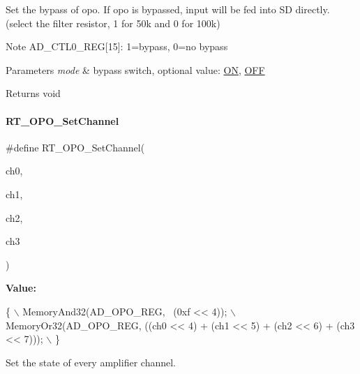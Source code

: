 Set the bypass of opo. If opo is bypassed, input will be fed into SD directly. (select the filter resistor, 1 for 50k and 0 for 100k) 

\begin{DoxyNote}{Note}
A\+D\+\_\+\+C\+T\+L0\+\_\+\+R\+EG\mbox{[}15\mbox{]}\+: 1=bypass, 0=no bypass 
\end{DoxyNote}

\begin{DoxyParams}{Parameters}
{\em mode} & bypass switch, optional value\+: \mbox{\hyperlink{a00020_ab43e533f3793920486fb81c580f71564a977d478dacaae531f95695750d1e9d03}{ON}}, \mbox{\hyperlink{a00020_ab43e533f3793920486fb81c580f71564aac132f2982b98bcaa3445e535a03ff75}{O\+FF}} \\
\hline
\end{DoxyParams}
\begin{DoxyReturn}{Returns}
void 
\end{DoxyReturn}
\mbox{\label{a00002_a5867d7cb8e45d61e08c23747ad488ff8}} 
\paragraph{\texorpdfstring{R\+T\+\_\+\+O\+P\+O\+\_\+\+Set\+Channel}{RT\_OPO\_SetChannel}}
{\footnotesize\ttfamily \#define R\+T\+\_\+\+O\+P\+O\+\_\+\+Set\+Channel(\begin{DoxyParamCaption}\item[{}]{ch0,  }\item[{}]{ch1,  }\item[{}]{ch2,  }\item[{}]{ch3 }\end{DoxyParamCaption})}

{\bfseries Value\+:}
\begin{DoxyCode}
\{                                                                                \(\backslash\)
        MemoryAnd32(AD\_OPO\_REG, ~(0xf << 4));                                        \(\backslash\)
        MemoryOr32(AD\_OPO\_REG, ((ch0 << 4) + (ch1 << 5) + (ch2 << 6) + (ch3 << 7))); \(\backslash\)
    \}
\end{DoxyCode}


Set the state of every amplifier channel. 


